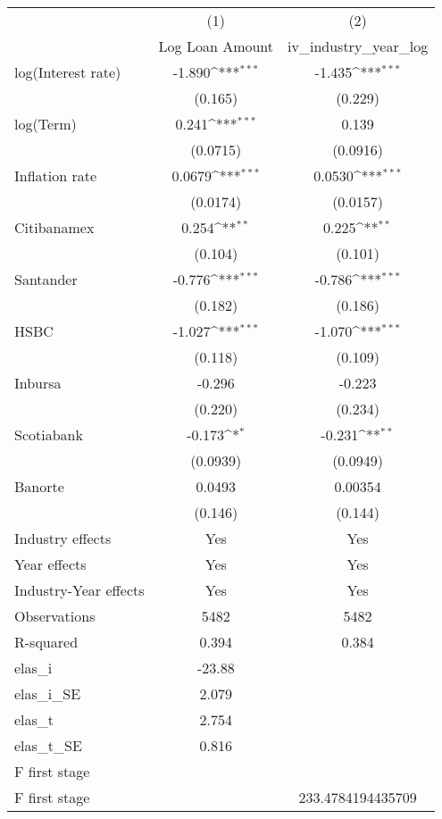 {
\def\sym#1{\ifmmode^{#1}\else\(^{#1}\)\fi}
\begin{tabular}{l*{2}{c}}
\hline\hline
                &\multicolumn{1}{c}{(1)}&\multicolumn{1}{c}{(2)}\\
                &\multicolumn{1}{c}{Log Loan Amount}&\multicolumn{1}{c}{iv_industry_year_log}\\
\hline
log(Interest rate)&   -1.890\sym{***}&   -1.435\sym{***}\\
                &  (0.165)         &  (0.229)         \\
log(Term)       &    0.241\sym{***}&    0.139         \\
                & (0.0715)         & (0.0916)         \\
Inflation rate  &   0.0679\sym{***}&   0.0530\sym{***}\\
                & (0.0174)         & (0.0157)         \\
Citibanamex     &    0.254\sym{**} &    0.225\sym{**} \\
                &  (0.104)         &  (0.101)         \\
Santander       &   -0.776\sym{***}&   -0.786\sym{***}\\
                &  (0.182)         &  (0.186)         \\
HSBC            &   -1.027\sym{***}&   -1.070\sym{***}\\
                &  (0.118)         &  (0.109)         \\
Inbursa         &   -0.296         &   -0.223         \\
                &  (0.220)         &  (0.234)         \\
Scotiabank      &   -0.173\sym{*}  &   -0.231\sym{**} \\
                & (0.0939)         & (0.0949)         \\
Banorte         &   0.0493         &  0.00354         \\
                &  (0.146)         &  (0.144)         \\
Industry effects &      Yes         &      Yes         \\
Year effects    &      Yes         &      Yes         \\
Industry-Year effects &      Yes         &      Yes         \\
\hline
Observations    &     5482         &     5482         \\
R-squared       &    0.394         &    0.384         \\
elas_i          &   -23.88         &                  \\
elas_i_SE       &    2.079         &                  \\
elas_t          &    2.754         &                  \\
elas_t_SE       &    0.816         &                  \\
F first stage   &                  &                  \\
F first stage   &                  &233.4784194435709         \\
\hline\hline
\end{tabular}
}

